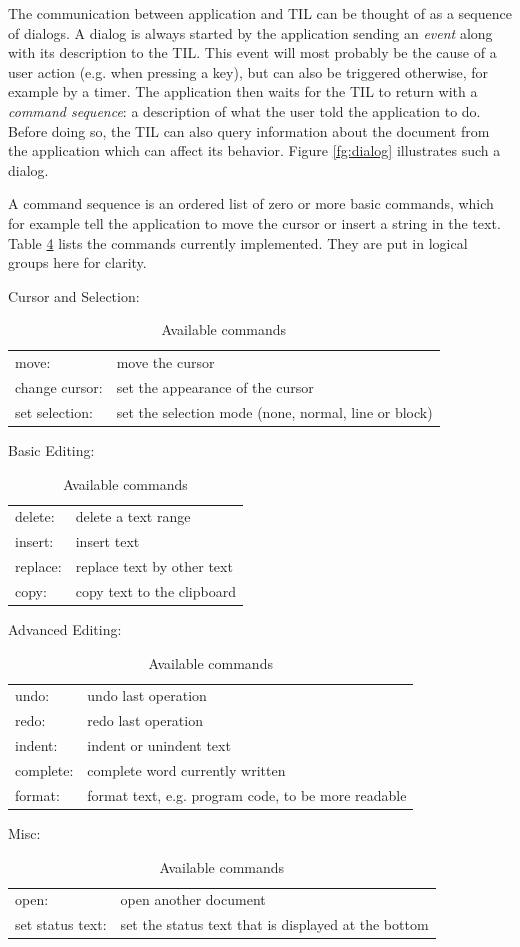 \documentclass[a4paper]{article}
\newenvironment{twocoltable}{\begin{tabular}{p{3cm}l}}{\end{tabular}}
\begin{document}
The communication between application and TIL can be thought of as a sequence of dialogs. A dialog is always started by the application sending an \emph{event} along with its description to the TIL. This event will most probably be the cause of a user action (e.g. when pressing a key), but can also be triggered otherwise, for example by a timer. The application then waits for the TIL to return with a \emph{command sequence}: a description of what the user told the application to do. Before doing so, the TIL can also query information about the document from the application which can affect its behavior. Figure \ref{fg:dialog} illustrates such a dialog.


A command sequence is an ordered list of zero or more basic commands, which for example tell the application to move the cursor or insert a string in the text. Table \ref{tb:commands} lists the commands currently implemented. They are put in logical groups here for clarity.

\begin{table}[p]
\setlength{\parskip}{10pt}
Cursor and Selection:

\begin{twocoltable}
move:	& move the cursor \\
change cursor:	& set the appearance of the cursor \\
set selection:	& set the selection mode (none, normal, line or block) \\
\end{twocoltable}

Basic Editing: 

\begin{twocoltable}
delete:	& delete a text range \\
insert:	& insert text \\
replace:	& replace text by other text \\
copy:	& copy text to the clipboard \\
\end{twocoltable}

Advanced Editing: 

\begin{twocoltable}
undo:	& undo last operation \\
redo:	& redo last operation \\
indent:	& indent or unindent text \\
complete:	& complete word currently written \\
format:	& format text, e.g. program code, to be more readable \\
\end{twocoltable}

Misc: 

\begin{twocoltable}
open:	& open another document \\
set status text:	& set the status text that is displayed at the bottom \\
\end{twocoltable}
\caption{Available commands}
\label{tb:commands}
\end{table}
\end{document}

